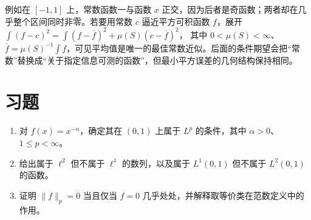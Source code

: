 例如在 $[-1,1]$ 上，常数函数一与函数 $x$ 正交，因为后者是奇函数；两者却在几乎整个区间同时非零。若要用常数 $c$ 逼近平方可积函数 $f$，展开
$\int(f-c)^2=\int(f-\overline f)^2+\mu(S)(c-\overline f)^2$，
其中 $0<\mu(S)<\infty$、$\overline f=\mu(S)^{-1}\int f$，可见平均值是唯一的最佳常数近似。后面的条件期望会把“常数”替换成“关于指定信息可测的函数”，但最小平方误差的几何结构保持相同。

\section{习题}
\begin{enumerate}
 \item 对 $f(x)=x^{-\alpha}$，确定其在 $(0,1)$ 上属于 $L^p$ 的条件，其中 $\alpha>0$、$1\leq p<\infty$。
 \item 给出属于 $\ell^2$ 但不属于 $\ell^1$ 的数列，以及属于 $L^1(0,1)$ 但不属于 $L^2(0,1)$ 的函数。
 \item 证明 $\|f\|_p=0$ 当且仅当 $f=0$ 几乎处处，并解释取等价类在范数定义中的作用。
\end{enumerate}

